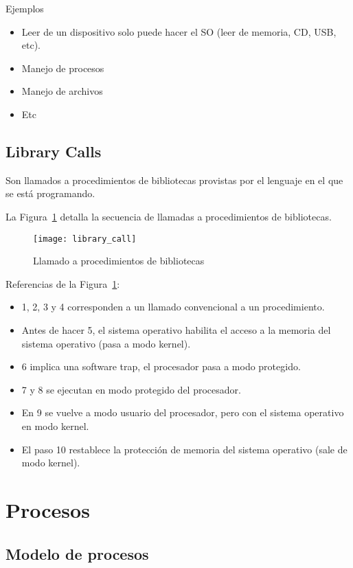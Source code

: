 \documentclass[a4paper, twoside]{article}
\begin{document}
Ejemplos
\begin{itemize}
	\item Leer de un dispositivo solo puede hacer el SO (leer de memoria, CD, USB, etc).
	\item Manejo de procesos
	\item Manejo de archivos
	\item Etc
\end{itemize}

\subsection{Library Calls}

Son llamados a procedimientos de bibliotecas provistas por el lenguaje en el que se está programando.

La Figura~\ref{fig:library_call} detalla la secuencia de llamadas a
procedimientos de bibliotecas.\\

\begin{figure}[h]
  \centering
  \texttt{[image: library\_call]}
  \caption{Llamado a procedimientos de bibliotecas}
  \label{fig:library_call}
\end{figure}

Referencias de la Figura~\ref{fig:library_call}:
\begin{itemize}
  \item 1, 2, 3 y 4 corresponden a un llamado convencional a un procedimiento.
  \item Antes de hacer 5, el sistema operativo habilita el acceso a la memoria
  del sistema operativo (pasa a modo kernel).
  \item 6 implica una software trap, el procesador pasa a modo protegido.
  \item 7 y 8 se ejecutan en modo protegido del procesador.
  \item En 9 se vuelve a modo usuario del procesador, pero con el sistema
  operativo en modo kernel.
  \item El paso 10 restablece la protección de memoria del sistema operativo
  (sale de modo kernel).
\end{itemize}

\newpage
\section{Procesos}

\subsection{Modelo de procesos}
\end{document}
